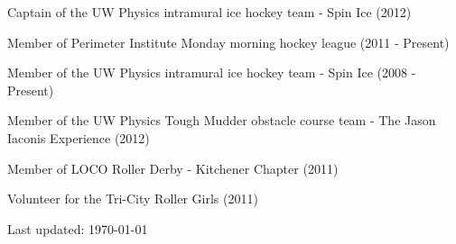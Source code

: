 \documentclass[letterpaper]{article}
\def\footerlink{http://jblevins.org/projects/cv-template/}
\renewenvironment{itemize}{
  \begin{list}{}{
    \setlength{\leftmargin}{1.5em}
  }
}{
  \end{list}
}
\begin{document}
\begin{itemize}

\item Captain of the UW Physics intramural ice hockey team - Spin Ice (2012)
\item Member of Perimeter Institute Monday morning hockey league (2011 - Present)
\item Member of the UW Physics intramural ice hockey team - Spin Ice (2008 - Present)
\item Member of the UW Physics Tough Mudder obstacle course team - The Jason Iaconis Experience (2012)
\item Member of LOCO Roller Derby - Kitchener Chapter (2011)
\item Volunteer for the Tri-City Roller Girls (2011)

\end{itemize}

\bigskip

\begin{center}
  \begin{footnotesize}
    Last updated: \today \\
  \end{footnotesize}
\end{center}
\end{document}
